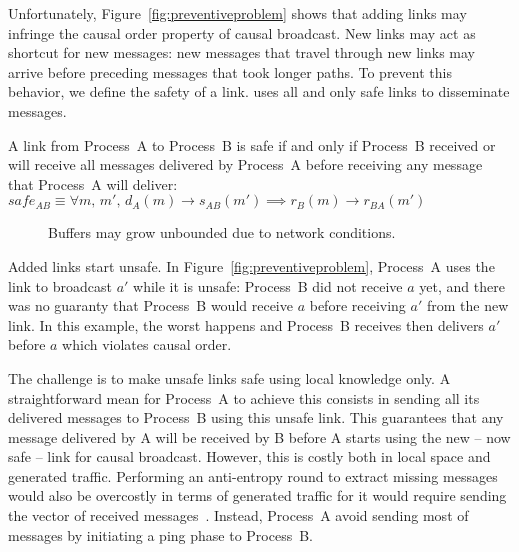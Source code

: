 Unfortunately, Figure~\ref{fig:preventiveproblem} shows that adding links may
infringe the causal order property of causal broadcast.  New links may act as
shortcut for new messages: new messages that travel through new links may arrive
before preceding messages that took longer paths. To prevent this behavior, we
define the safety of a link. \CBROADCAST uses all and only safe links to
disseminate messages.

\begin{definition}
  A link from Process~A to Process~B is safe if and only if Process~B received
  or will receive all messages delivered by Process~A before receiving any
  message that Process~A will deliver:
  $safe_{AB} \equiv \forall m,\, m',\, d_A(m) \rightarrow s_{AB}(m') \implies
  r_B(m) \rightarrow r_{BA}(m')$
\end{definition}

\begin{figure*}
  \begin{center}
    \hspace{20pt}
    \hspace{20pt}
    \caption{\label{fig:bufferproblem}Buffers may grow unbounded due to network
      conditions.}
  \end{center}
\end{figure*}


Added links start unsafe. In Figure~\ref{fig:preventiveproblem}, Process~A uses
the link to broadcast $a'$ while it is unsafe: Process~B did not receive $a$
yet, and there was no guaranty that Process~B would receive $a$ before receiving
$a'$ from the new link. In this example, the worst happens and Process~B
receives then delivers $a'$ before $a$ which violates causal order.

The challenge is to make unsafe links safe using local knowledge only. A
straightforward mean for Process~A to achieve this consists in sending all its
delivered messages to Process~B using this unsafe link. This guarantees that any
message delivered by A will be received by B before A starts using the new --
now safe -- link for causal broadcast. However, this is costly both in local
space and generated traffic. Performing an anti-entropy round to extract missing
messages would also be overcostly in terms of generated traffic for it would
require sending the vector of received messages~\cite{demers1987epidemic}.
Instead, Process~A avoid sending most of messages by initiating a ping phase
to Process~B. %

